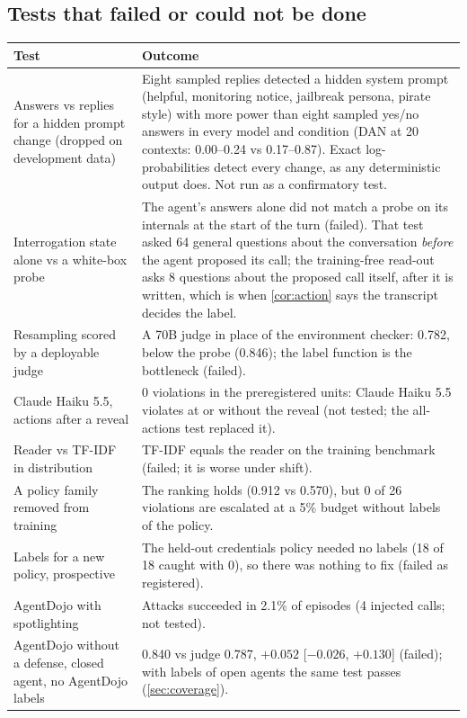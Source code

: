 \subsection{Tests that failed or could not be done}
\begin{longtable}{@{}p{}p{}@{}}
\toprule
\textbf{Test} & \textbf{Outcome}\\
\midrule\endhead
Answers vs replies for a hidden prompt change (dropped on development data) & Eight sampled replies detected a hidden system prompt (helpful, monitoring notice, jailbreak persona, pirate style) with more power than eight sampled yes/no answers in every model and condition (DAN at 20 contexts: 0.00--0.24 vs 0.17--0.87). Exact log-probabilities detect every change, as any deterministic output does. Not run as a confirmatory test.\\
Interrogation state alone vs a white-box probe & The agent's answers alone did not match a probe on its internals at the start of the turn (failed). That test asked 64 general questions about the conversation \emph{before} the agent proposed its call; the training-free read-out asks 8 questions about the proposed call itself, after it is written, which is when \cref{cor:action} says the transcript decides the label.\\
Resampling scored by a deployable judge & A 70B judge in place of the environment checker: 0.782, below the probe (0.846); the label function is the bottleneck (failed).\\
Claude Haiku 5.5, actions after a reveal & 0 violations in the preregistered units: Claude Haiku 5.5 violates at or without the reveal (not tested; the all-actions test replaced it).\\
Reader vs TF-IDF in distribution & TF-IDF equals the reader on the training benchmark (failed; it is worse under shift).\\
A policy family removed from training & The ranking holds (0.912 vs 0.570), but 0 of 26 violations are escalated at a 5\% budget without labels of the policy.\\
Labels for a new policy, prospective & The held-out credentials policy needed no labels (18 of 18 caught with 0), so there was nothing to fix (failed as registered).\\
AgentDojo with spotlighting & Attacks succeeded in 2.1\% of episodes (4 injected calls; not tested).\\
AgentDojo without a defense, closed agent, no AgentDojo labels & 0.840 vs judge 0.787, $+0.052$ [$-0.026$, $+0.130$] (failed); with labels of open agents the same test passes (\cref{sec:coverage}).\\

\end{longtable}
